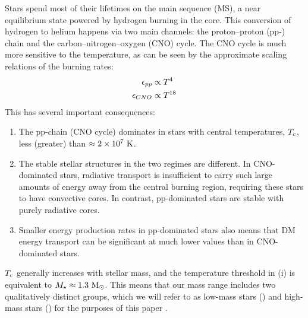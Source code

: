 \documentclass[useAMS,usenatbib]{mnras}
\begin{document}
  Stars spend most of their lifetimes on the main sequence (MS), a near equilibrium state powered by hydrogen burning in the core. This conversion of hydrogen to helium happens via two main channels: the proton–proton (pp-) chain and the carbon–nitrogen–oxygen (CNO) cycle. The CNO cycle is much more sensitive to the temperature, as can be seen by the approximate scaling relations of the burning rates:
  \begin{align}
    \epsilon_{pp} &\propto T^4 \\
    \epsilon_{CNO} &\propto T^{18}
  \end{align}
  This has several important consequences:
  \begin{enumerate}
    \item The pp-chain (CNO cycle) dominates in stars with central temperatures, $T_c$, less (greater) than $\approx 2 \times 10^7 \ \mathrm{K}$.

    \item The stable stellar structures in the two regimes are different. In CNO-dominated stars, radiative transport is insufficient to carry such large amounts of energy away from the central burning region, requiring these stars to have convective cores. In contrast, pp-dominated stars are stable with purely radiative cores.

    \item Smaller energy production rates in pp-dominated stars also means that DM energy transport can be significant at much lower values than in CNO-dominated stars.
  \end{enumerate}

  $T_c$ generally increases with stellar mass, and the temperature threshold in (i) is equivalent to $M_{\star} \approx 1.3 \ \mathrm{M}_{\odot}$. This means that our mass range includes two qualitatively distinct groups, which we will refer to as low-mass stars (\mrangelow) and high-mass stars (\mrangehigh) for the purposes of this paper . 
\end{document}
